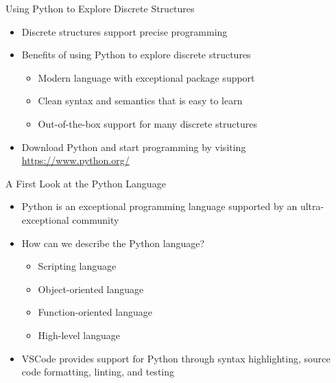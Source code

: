\documentclass[14pt,aspectratio=169]{beamer}
\begin{document}
%
\begin{frame}{Using Python to Explore Discrete Structures}
  \begin{itemize}
    \item Discrete structures support precise programming
    \item Benefits of using Python to explore discrete structures
      \begin{itemize}
        \item Modern language with exceptional package support
        \item Clean syntax and semantics that is easy to learn
        \item Out-of-the-box support for many discrete structures
      \end{itemize}
    \item Download Python and start programming by visiting
      \url{https://www.python.org/}
  \end{itemize}
\end{frame}

%
\begin{frame}{A First Look at the Python Language}
  \begin{itemize}
    \item Python is an exceptional programming language supported by an
      ultra-exceptional community
      \vspace*{-.15in}
    \item How can we describe the Python language?
      \begin{itemize}
        \item Scripting language
        \item Object-oriented language
        \item Function-oriented language
        \item High-level language
      \end{itemize}
      \vspace*{-.15in}
    \item VSCode provides support for Python through syntax highlighting, source
      code formatting, linting, and testing
  \end{itemize}
\end{frame}
\end{document}
